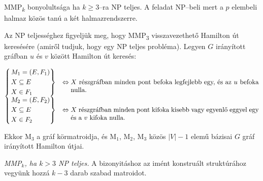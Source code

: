 MMP\textsubscript{$k$} bonyolultsága ha $k \geq 3$--ra NP teljes. A feladat
NP--beli mert a $p$ elembeli halmaz közös tanú a két halmazrendszerre.

Az NP teljességhez figyeljük meg, hogy MMP\textsubscript{$3$} visszavezethető
Hamilton út keresésére (amiről tudjuk, hogy egy NP teljes probléma). Legyen $G$
irányított gráfban $u$ és $v$ között Hamilton út keresés:

\[
\begin{cases}
\begin{rcases}
M_1=(E,F_1) \\
X \subseteq E \\
X \in F_1
\end{rcases} &\Leftrightarrow \parbox[t]{10cm} {$X$ részgráfban minden pont
befoka legfejlebb egy, és az $u$ befoka nulla.} \\
\begin{rcases}
M_2=(E,F_2) \\
X \subseteq E \\
X \in F_2
\end{rcases} &\Leftrightarrow \parbox[t]{10cm} {$X$ részgráfban minden pont
kifoka kisebb vagy egyenlő eggyel egy és a $v$ kifoka nulla.} 
\end{cases}
\]

Ekkor M$_3$  a gráf körmatroidja, és M$_1$, M$_2$, M$_3$ közös $|V|-1$ elemű
bázisai $G$ gráf irányított Hamilton útjai.

\vspace{0.4cm}
\emph{MMP$_k$, ha $k>3$ NP teljes.} 
A bizonyitáshoz az imént konstruált struktúrához vegyünk hozzá $k-3$ darab
szabad matroidot.